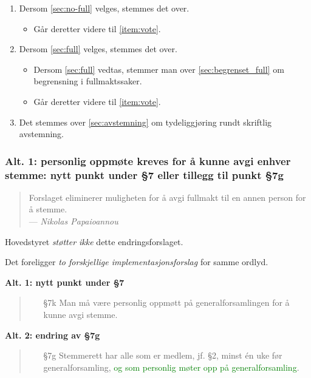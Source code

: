 \documentclass[10pt,norsk,a4paper]{article}
\begin{document}
\begin{enumerate}
	\item Dersom \cref{sec:no-full} velges, stemmes det over.
		\begin{itemize}
			\item Går deretter videre til \cref{item:vote}.
		\end{itemize}
	\item Dersom \cref{sec:full} velges, stemmes det over.
		\begin{itemize}
			\item Dersom \cref{sec:full} vedtas, stemmer man over \cref{sec:begrenset_full} om begrensning i fullmaktssaker.
			\item Går deretter videre til \cref{item:vote}.
		\end{itemize}
	\item Det stemmes over \cref{sec:avstemning} om tydeliggjøring rundt skriftlig avstemning.\label{item:vote}
\end{enumerate}

\subsubsection{Alt. 1: personlig oppmøte kreves for å kunne avgi enhver stemme:
               nytt punkt under §7 eller tillegg til punkt §7g\label{sec:no-full}}
\begin{quote}
	Forslaget eliminerer muligheten for å avgi fullmakt til en annen person for å stemme.\\
	--- \emph{Nikolas Papaioannou}
\end{quote}

Hovedstyret \emph{støtter ikke} dette endringsforslaget.

Det foreligger \emph{to forskjellige implementasjonsforslag} for samme ordlyd.

\textbf{Alt. 1: nytt punkt under §7}
\begin{quote}
	\begin{enumerate}
		\item[§7k] Man må være personlig oppmøtt på generalforsamlingen for å kunne avgi stemme.
	\end{enumerate}
\end{quote}

\textbf{Alt. 2: endring av §7g}
\begin{quote}
    \begin{enumerate}
        \item[§7g] Stemmerett har alle som er medlem, jf. §2, minst én uke før generalforsamling,
                  \textcolor{green}{og som personlig møter opp på generalforsamling}.
    \end{enumerate}
\end{quote}
\end{document}
